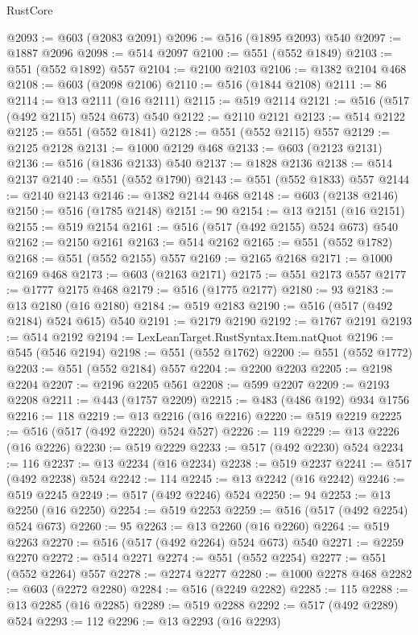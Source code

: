 \begin{lexlean}{RustCore}
\begin{coremodule}
@2093 := @603 (@2083 @2091)
@2096 := @516 (@1895 @2093) @540
@2097 := @1887 @2096
@2098 := @514 @2097
@2100 := @551 (@552 @1849)
@2103 := @551 (@552 @1892) @557
@2104 := @2100 @2103
@2106 := @1382 @2104 @468
@2108 := @603 (@2098 @2106)
@2110 := @516 (@1844 @2108)
@2111 := 86
@2114 := @13 @2111 (@16 @2111)
@2115 := @519 @2114
@2121 := @516 (@517 (@492 @2115) @524 @673) @540
@2122 := @2110 @2121
@2123 := @514 @2122
@2125 := @551 (@552 @1841)
@2128 := @551 (@552 @2115) @557
@2129 := @2125 @2128
@2131 := @1000 @2129 @468
@2133 := @603 (@2123 @2131)
@2136 := @516 (@1836 @2133) @540
@2137 := @1828 @2136
@2138 := @514 @2137
@2140 := @551 (@552 @1790)
@2143 := @551 (@552 @1833) @557
@2144 := @2140 @2143
@2146 := @1382 @2144 @468
@2148 := @603 (@2138 @2146)
@2150 := @516 (@1785 @2148)
@2151 := 90
@2154 := @13 @2151 (@16 @2151)
@2155 := @519 @2154
@2161 := @516 (@517 (@492 @2155) @524 @673) @540
@2162 := @2150 @2161
@2163 := @514 @2162
@2165 := @551 (@552 @1782)
@2168 := @551 (@552 @2155) @557
@2169 := @2165 @2168
@2171 := @1000 @2169 @468
@2173 := @603 (@2163 @2171)
@2175 := @551 @2173 @557
@2177 := @1777 @2175 @468
@2179 := @516 (@1775 @2177)
@2180 := 93
@2183 := @13 @2180 (@16 @2180)
@2184 := @519 @2183
@2190 := @516 (@517 (@492 @2184) @524 @615) @540
@2191 := @2179 @2190
@2192 := @1767 @2191
@2193 := @514 @2192
@2194 := LexLeanTarget.RustSyntax.Item.natQuot
@2196 := @545 (@546 @2194)
@2198 := @551 (@552 @1762)
@2200 := @551 (@552 @1772)
@2203 := @551 (@552 @2184) @557
@2204 := @2200 @2203
@2205 := @2198 @2204
@2207 := @2196 @2205 @561
@2208 := @599 @2207
@2209 := @2193 @2208
@2211 := @443 (@1757 @2209)
@2215 := @483 (@486 @192) @934 @1756
@2216 := 118
@2219 := @13 @2216 (@16 @2216)
@2220 := @519 @2219
@2225 := @516 (@517 (@492 @2220) @524 @527)
@2226 := 119
@2229 := @13 @2226 (@16 @2226)
@2230 := @519 @2229
@2233 := @517 (@492 @2230) @524
@2234 := 116
@2237 := @13 @2234 (@16 @2234)
@2238 := @519 @2237
@2241 := @517 (@492 @2238) @524
@2242 := 114
@2245 := @13 @2242 (@16 @2242)
@2246 := @519 @2245
@2249 := @517 (@492 @2246) @524
@2250 := 94
@2253 := @13 @2250 (@16 @2250)
@2254 := @519 @2253
@2259 := @516 (@517 (@492 @2254) @524 @673)
@2260 := 95
@2263 := @13 @2260 (@16 @2260)
@2264 := @519 @2263
@2270 := @516 (@517 (@492 @2264) @524 @673) @540
@2271 := @2259 @2270
@2272 := @514 @2271
@2274 := @551 (@552 @2254)
@2277 := @551 (@552 @2264) @557
@2278 := @2274 @2277
@2280 := @1000 @2278 @468
@2282 := @603 (@2272 @2280)
@2284 := @516 (@2249 @2282)
@2285 := 115
@2288 := @13 @2285 (@16 @2285)
@2289 := @519 @2288
@2292 := @517 (@492 @2289) @524
@2293 := 112
@2296 := @13 @2293 (@16 @2293)

\end{coremodule}
\end{lexlean}
